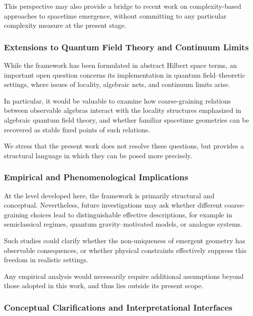 \documentclass[12pt,a4paper]{article}
\begin{document}
This perspective may also provide a bridge to recent work on complexity-based approaches to spacetime emergence, without committing to any particular complexity measure at the present stage.

\subsubsection{Extensions to Quantum Field Theory and Continuum Limits}

While the framework has been formulated in abstract Hilbert space terms, an important open question concerns its implementation in quantum field--theoretic settings, where issues of locality, algebraic nets, and continuum limits arise.

In particular, it would be valuable to examine how coarse-graining relations between observable algebras interact with the locality structures emphasized in algebraic quantum field theory, and whether familiar spacetime geometries can be recovered as stable fixed points of such relations.

We stress that the present work does not resolve these questions, but provides a structural language in which they can be posed more precisely.

\subsubsection{Empirical and Phenomenological Implications}

At the level developed here, the framework is primarily structural and conceptual. 
Nevertheless, future investigations may ask whether different coarse-graining choices lead to distinguishable effective descriptions, for example in semiclassical regimes, quantum gravity--motivated models, or analogue systems.

Such studies could clarify whether the non-uniqueness of emergent geometry has observable consequences, or whether physical constraints effectively suppress this freedom in realistic settings.

Any empirical analysis would necessarily require additional assumptions beyond those adopted in this work, and thus lies outside its present scope.

\subsubsection{Conceptual Clarifications and Interpretational Interfaces}
\end{document}
